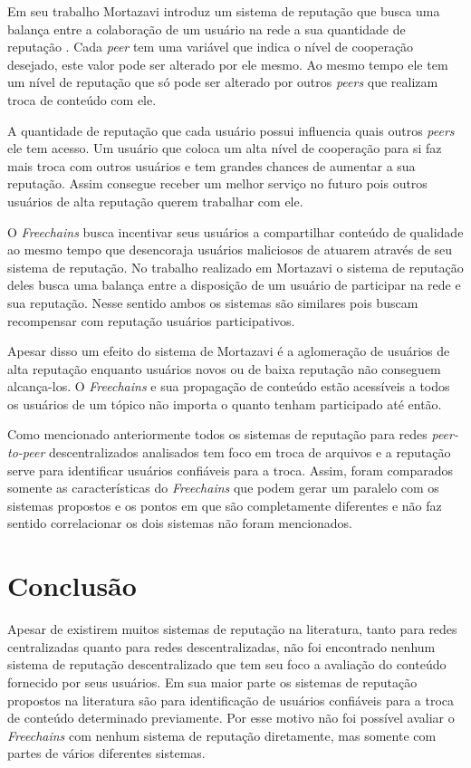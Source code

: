 \documentclass[12pt]{article}
\newcommand{\FC} {\emph{Freechains}\xspace}
\newcommand{\PtoP} {\emph{peer-to-peer}\xspace}
\begin{document}
Em seu trabalho Mortazavi introduz um sistema de reputação que busca uma balança entre a colaboração de um usuário na rede a sua quantidade de reputação \cite{mortazavi2006cumulative}. 
Cada \emph{peer} tem uma variável que indica o nível de cooperação desejado, este valor pode ser alterado por ele mesmo. 
Ao mesmo tempo ele tem um nível de reputação que só pode ser alterado por outros \emph{peers} que realizam troca de conteúdo com ele.

A quantidade de reputação que cada usuário possui influencia quais outros \emph{peers} ele tem acesso. 
Um usuário que coloca um alta nível de cooperação para si faz mais troca com outros usuários e tem grandes chances de aumentar a sua reputação. 
Assim consegue receber um melhor serviço no futuro pois outros usuários de alta reputação querem trabalhar com ele.

O \FC busca incentivar seus usuários a compartilhar conteúdo de qualidade ao mesmo tempo que desencoraja usuários maliciosos de atuarem através de seu sistema de reputação. 
No trabalho realizado em Mortazavi o sistema de reputação deles busca uma balança entre a disposição de um usuário de participar na rede e sua reputação. 
Nesse sentido ambos os sistemas são similares pois buscam recompensar com reputação usuários participativos.

Apesar disso um efeito do sistema de Mortazavi é a aglomeração de usuários de alta reputação enquanto usuários novos ou de baixa reputação não conseguem alcança-los. 
O \FC e sua propagação de conteúdo estão acessíveis a todos os usuários de um tópico não importa o quanto tenham participado até então.

Como mencionado anteriormente todos os sistemas de reputação para redes \PtoP descentralizados analisados tem foco em troca de arquivos e a reputação serve para identificar usuários confiáveis para a troca. 
Assim, foram comparados somente as características do \FC que podem gerar um paralelo com os sistemas propostos e os pontos em que são completamente diferentes e não faz sentido correlacionar os dois sistemas não foram mencionados.  

\section{Conclusão}\label{sec:conclusao}

Apesar de existirem muitos sistemas de reputação na literatura, tanto para redes centralizadas quanto para redes descentralizadas, não foi encontrado nenhum sistema de reputação descentralizado que tem seu foco a avaliação do conteúdo fornecido por seus usuários. 
Em sua maior parte os sistemas de reputação propostos na literatura são para identificação de usuários confiáveis para a troca de conteúdo determinado previamente. 
Por esse motivo não foi possível avaliar o \FC com nenhum sistema de reputação diretamente, mas somente com partes de vários diferentes sistemas.
\end{document}
